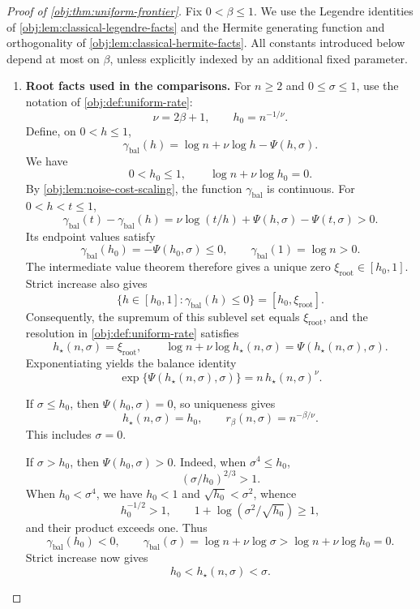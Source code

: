 \documentclass[11pt]{article}
\begin{document}
\begin{proof}[Proof of \cref{obj:thm:uniform-frontier}]
Fix \(0<\beta\le1\). We use the Legendre identities of
\cref{obj:lem:classical-legendre-facts} and the Hermite generating function and orthogonality of
\cref{obj:lem:classical-hermite-facts}. All constants introduced below depend at most on \(\beta\), unless explicitly indexed by an additional fixed parameter.

\begin{enumerate}
\item \textbf{Root facts used in the comparisons.}
For \(n\ge2\) and \(0\le\sigma\le1\), use the notation of
\cref{obj:def:uniform-rate}:
\[
\nu=2\beta+1,\qquad h_0=n^{-1/\nu}.
\]
Define, on \(0<h\le1\),
\[
\gamma_{\mathrm{bal}}(h)
=\log n+\nu\log h-\Psi(h,\sigma).
\]
We have
\[
0<h_0\le1,\qquad
\log n+\nu\log h_0=0.
\]
By \cref{obj:lem:noise-cost-scaling}, the function
\(\gamma_{\mathrm{bal}}\) is continuous. For \(0<h<t\le1\),
\[
\gamma_{\mathrm{bal}}(t)-\gamma_{\mathrm{bal}}(h)
=\nu\log(t/h)+\Psi(h,\sigma)-\Psi(t,\sigma)>0.
\]
Its endpoint values satisfy
\[
\gamma_{\mathrm{bal}}(h_0)=-\Psi(h_0,\sigma)\le0,
\qquad
\gamma_{\mathrm{bal}}(1)=\log n>0.
\]
The intermediate value theorem therefore gives a unique zero
\(\xi_{\mathrm{root}}\in[h_0,1]\). Strict increase also gives
\[
\{h\in[h_0,1]:\gamma_{\mathrm{bal}}(h)\le0\}
=[h_0,\xi_{\mathrm{root}}].
\]
Consequently, the supremum of this sublevel set equals
\(\xi_{\mathrm{root}}\), and the resolution in
\cref{obj:def:uniform-rate} satisfies
\[
h_\star(n,\sigma)=\xi_{\mathrm{root}},
\qquad
\log n+\nu\log h_\star(n,\sigma)
=\Psi(h_\star(n,\sigma),\sigma).
\]
Exponentiating yields the balance identity
\[
\exp\{\Psi(h_\star(n,\sigma),\sigma)\}
=n\,h_\star(n,\sigma)^\nu.
\]

If \(\sigma\le h_0\), then \(\Psi(h_0,\sigma)=0\), so uniqueness gives
\[
h_\star(n,\sigma)=h_0,\qquad
r_\beta(n,\sigma)=n^{-\beta/\nu}.
\]
This includes \(\sigma=0\).

If \(\sigma>h_0\), then \(\Psi(h_0,\sigma)>0\). Indeed, when
\(\sigma^4\le h_0\),
\[
(\sigma/h_0)^{2/3}>1.
\]
When \(h_0<\sigma^4\), we have \(h_0<1\) and
\(\sqrt{h_0}<\sigma^2\), whence
\[
h_0^{-1/2}>1,\qquad
1+\log(\sigma^2/\sqrt{h_0})\ge1,
\]
and their product exceeds one. Thus
\[
\gamma_{\mathrm{bal}}(h_0)<0,
\qquad
\gamma_{\mathrm{bal}}(\sigma)
=\log n+\nu\log\sigma
>\log n+\nu\log h_0=0.
\]
Strict increase now gives
\[
h_0<h_\star(n,\sigma)<\sigma.
\]


\end{enumerate}
\end{proof}
\end{document}
